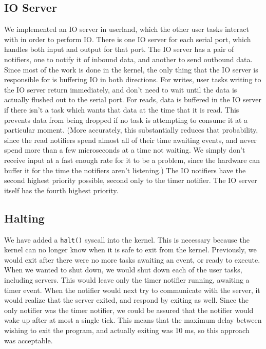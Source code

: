 \documentclass[titlepage]{article}
\begin{document}
\subsection{IO Server}
We implemented an IO server in userland, which the other user tasks interact with
in order to perform IO.
There is one IO server for each serial port, which handles both input and output
for that port.
The IO server has a pair of notifiers, one to notify it of inbound data, and another
to send outbound data.
Since most of the work is done in the kernel, the only thing that the IO server
is responsible for is buffering IO in both directions.
For writes, user tasks writing to the IO server return immediately, and don't need
to wait until the data is actually flushed out to the serial port.
For reads, data is buffered in the IO server if there isn't a task which wants
that data at the time that it is read.
This prevents data from being dropped if no task is attempting to consume it at a particular moment.
(More accurately, this substantially reduces that probability, since the read notifiers
spend almost all of their time awaiting events, and never spend more than a few microseconds
at a time not waiting. We simply don't receive input at a fast enough rate for it to be a problem, since
the hardware can buffer it for the time the notifiers aren't listening.)
The IO notifiers have the second highest priority possible, second only to the timer notifier.
The IO server itself has the fourth highest priority.

\subsection{Halting}
We have added a \texttt{halt()} syscall into the kernel.
This is necessary because the kernel can no longer know when it is safe to exit from the kernel.
Previously, we would exit after there were no more tasks awaiting an event, or ready to execute.
When we wanted to shut down, we would shut down each of the user tasks, including servers.
This would leave only the timer notifier running, awaiting a timer event.
When the notifier would next try to communicate with the server, it would realize
that the server exited, and respond by exiting as well.
Since the only notifier was the timer notifier, we could be assured that the notifier
would wake up after at most a single tick.
This means that the maximum delay between wishing to exit the program, and actually
exiting was 10 ms, so this approach was acceptable.
\end{document}

